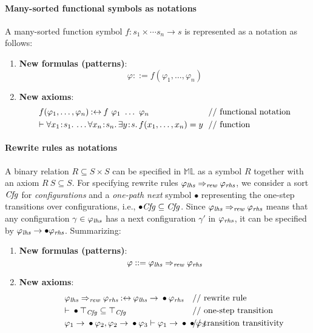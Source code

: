 \documentclass{article}
\theoremstyle{plain}
\theoremstyle{definition}
\newcommand{\cln}{{\kern0.2ex:\kern0.2ex}}
\newcommand{\ld}{\mathord{.\,}}
\newcommand{\ML}{$\mathbb{ML}$\xspace}
\newcommand{\inh}[1]{\top_{#1}}
\newcommand{\eqbynot}{\mathbin{{:}{\leftrightarrow}}}
\begin{document}
\paragraph{Many-sorted functional symbols as notations\\}
A many-sorted function symbol $f:s_1\times\cdots s_n\to s$ is represented as a notation as follows:
\begin{enumerate}
\item \textbf{New formulas (patterns)}: 
\[
\varphi ::= f(\varphi_1,\ldots,\varphi_n)
\]
\item \textbf{New axioms}:
\begin{align*}
f(\varphi_1,\ldots,\varphi_n) & \eqbynot f\ \varphi_1\ \ldots\ \varphi_n\qquad\qquad\qquad
& \textrm{// functional notation}\\
\omit\rlap{$\vdash \forall x_1 \cln s_1 \ld \dots \forall x_n \cln s_n \ld \exists y \cln s \ld f(x_1,\ldots,x_n) = y$}
&&\omit\rlap{\textrm{// function}}
\end{align*}
\end{enumerate}


\paragraph{Rewrite rules as notations\\}
A binary relation $R\subseteq S\times S$ can be specified in \ML as a symbol $R$ together with an axiom $R\ S\subseteq S$.
For specifying rewrite rules $\varphi_{\it lhs}\Rightarrow_{\it rew}\varphi_{\it rhs}$, we consider a sort $\it Cfg$ for \emph{configurations} and a
\emph{one-path next} symbol $\bullet$ representing the one-step transitions over configurations, i.e., $\bullet {\it Cfg}\subseteq {\it Cfg}$. 
Since $\varphi_{\it lhs}\Rightarrow_{\it rew}\varphi_{\it rhs}$ means that any configuration $\gamma\in \varphi_{\it lhs}$ has a next configuration $\gamma'$ in $\varphi_{\it rhs}$, it can be specified by
$\varphi_{\it lhs}\rightarrow \bullet \varphi_{\it rhs}$. Summarizing:

\begin{enumerate}
\item \textbf{New formulas (patterns)}: 
\[
\varphi ::= \varphi_{\it lhs}\Rightarrow_{\it rew} \varphi_{\it rhs}
\]
\item \textbf{New axioms}:
\begin{align*}
\hspace{-5ex}\varphi_{\it lhs}\Rightarrow_{\it rew} \varphi_{\it rhs} & \eqbynot \varphi_{\it lhs}\rightarrow {}\bullet{} \varphi_{\it rhs}
& \textrm{// rewrite rule}\\
\omit\rlap{\hspace{-5ex}$\vdash {}\bullet{} \inh{\it Cfg}\subseteq \inh{\it Cfg}$}
&&\omit\rlap{\textrm{// one-step transition}}\\
\omit\rlap{\hspace{-5ex}$\varphi_1 \rightarrow {}\bullet \varphi_2, \varphi_2 \rightarrow {}\bullet \varphi_3\vdash \varphi_1 \rightarrow {}\bullet {} \bullet{} \varphi_3$}
&&\omit\rlap{\textrm{// transition transitivity}}
\end{align*}
\end{enumerate}
\end{document}
